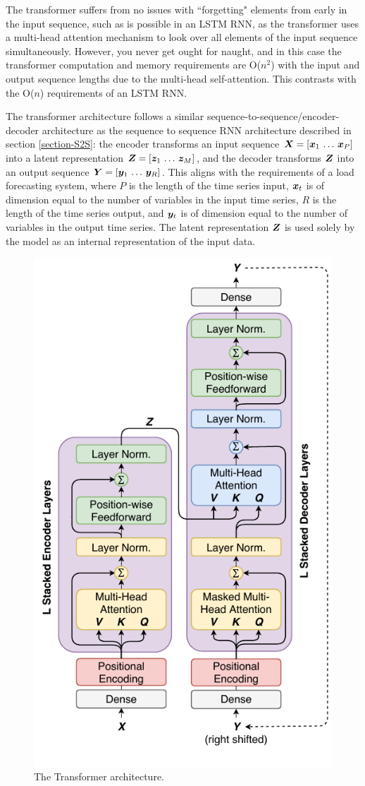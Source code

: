 The transformer suffers from no issues with ``forgetting" elements from early in the input sequence, such as is possible in an LSTM RNN, as the transformer uses a multi-head attention mechanism to look over all elements of the input sequence simultaneously.
However, you never get ought for naught, and in this case the transformer computation and memory requirements are O($n^2$) with the input and output sequence lengths due to the multi-head self-attention.
This contrasts with the O($n$) requirements of an LSTM RNN.

The transformer architecture follows a similar sequence-to-sequence/encoder-decoder architecture as the sequence to sequence RNN architecture described in section \ref{section-S2S}: the encoder transforms an input sequence ${\bm{X}} = [{\bm{x}}_1 \, \ldots \, {\bm{x}}_P]$ into a latent representation ${\bm{Z}} = [{\bm{z}}_1 \, \ldots \, {\bm{z}}_M]$, and the decoder transforms ${\bm{Z}}$ into an output sequence ${\bm{Y}} = [{\bm{y}}_1 \, \ldots \, {\bm{y}}_R]$.
This aligns with the requirements of a load forecasting system, where $P$ is the length of the time series input, ${\bm{x}}_t$ is of dimension equal to the number of variables in the input time series, $R$ is the length of the time series output, and ${\bm{y}}_t$ is of dimension equal to the number of variables in the output time series.
The latent representation ${\bm{Z}}$ is used solely by the model as an internal representation of the input data.

\begin{figure}[htbp]
	\centerline{\includegraphics[trim=0 0cm 0 0, width=.4\textwidth]{images/transformer.pdf}}
	\caption{The Transformer architecture.}
	\label{fig:transformer}
\end{figure}

